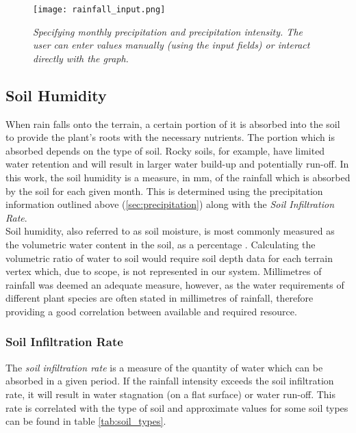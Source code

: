 \begin{figure}
\center
	\texttt{[image: rainfall\_input.png]}
	\caption{ \textit{Specifying monthly precipitation and precipitation intensity. The user can enter values manually (using the input fields) or interact directly with the graph.}}
	\label{fig:rainfall_input}
\end{figure}

\subsection{Soil Humidity}

When rain falls onto the terrain, a certain portion of it is absorbed into the soil to provide the plant's roots with the necessary nutrients. The portion which is absorbed depends on the type of soil. Rocky soils, for example, have limited water retention and will result in larger water build-up and potentially run-off. In this work, the soil humidity is a measure, in mm, of the rainfall which is absorbed by the soil for each given month. This is determined using the precipitation information outlined above (\ref{sec:precipitation}) along with the \textit{Soil Infiltration Rate}.\\

Soil humidity, also referred to as soil moisture, is most commonly measured as the volumetric water content in the soil, as a percentage \cite{Corps1980}. Calculating the volumetric ratio of water to soil would require soil depth data for each terrain vertex which, due to scope, is not represented in our system. Millimetres of rainfall was deemed an adequate measure, however, as the water requirements of different plant species are often stated in millimetres of rainfall, therefore providing a good correlation between available and required resource. 

\subsubsection{Soil Infiltration Rate}\label{subsubsec:soil_infiltration_rate}

The \textit{soil infiltration rate} is a measure of the quantity of water which can be absorbed in a given period. If the rainfall intensity exceeds the soil infiltration rate, it will result in water stagnation (on a flat surface) or water run-off. This rate is correlated with the type of soil and approximate values for some soil types can be found in table \ref{tab:soil_types}.

